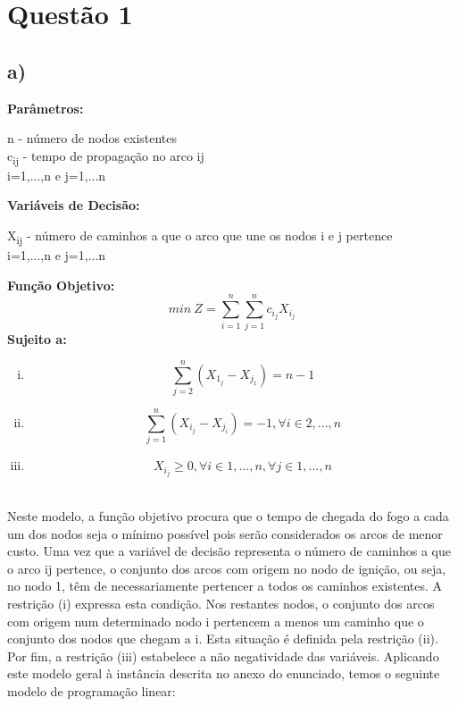 \documentclass[11pt]{article} %
\begin{document}
\newpage

\section*{Questão 1}
\subsection*{a)}
\textbf{Parâmetros:}  \\
\begin{center}
n - número de nodos existentes \\
c\textsubscript{ij} - tempo de propagação no arco ij\\
i=1,...,n e j=1,...n \\
\end{center}
\textbf{Variáveis de Decisão:} \\
\begin{center}
X\textsubscript{ij} - número de caminhos a que o arco que une os nodos i e j pertence\\
i=1,...,n e j=1,...n \\
\end{center}
\textbf{Função Objetivo:} \\
$$min \ Z = \sum_{i=1}^{n} \sum_{j=1}^{n} c_i_jX_i_j$$
\textbf{Sujeito a:}
\begin{enumerate}[(i)]
\item $$\sum_{j=2}^{n} (X_1_j - X_j_1) = n-1$$
\item $$\sum_{j=1}^{n} (X_i_j - X_j_i) = -1, \forall i \in 2,...,n $$
\item $$X_i_j \geq 0, \forall i \in 1,...,n , \forall j \in 1,...,n$$
\end{enumerate}\\


Neste modelo, a função objetivo procura que o tempo de chegada do fogo a cada um dos nodos seja o mínimo possível pois serão considerados os arcos de menor custo. Uma vez que a variável de decisão representa o número de caminhos a que o arco ij pertence, o conjunto dos arcos com origem no nodo de ignição, ou seja, no nodo 1,  têm de necessariamente pertencer a todos os caminhos existentes. A restrição (i) expressa esta condição. Nos restantes nodos, o conjunto dos arcos com origem num determinado nodo i pertencem a menos um caminho que o conjunto dos nodos que chegam a i. Esta situação é definida pela restrição (ii). Por fim, a restrição (iii) estabelece a não negatividade das variáveis.
Aplicando este modelo geral à instância descrita no anexo do enunciado, temos o seguinte modelo de programação linear:
\end{document}
